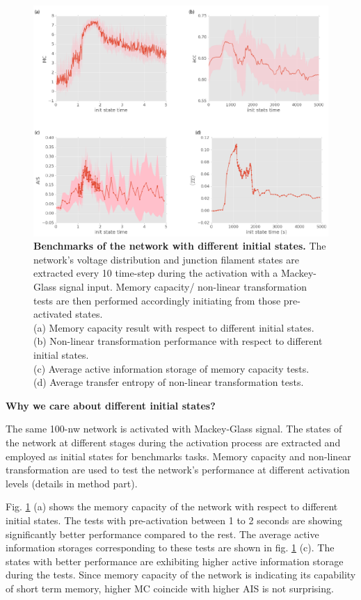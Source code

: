 \documentclass[%
 reprint,
 amsmath,amssymb,
 aps,
floatfix,
]{revtex4-2}
\begin{document}
\begin{figure}[]
	\centering
	\includegraphics[width=1\linewidth]{figure/benchmark.png}
	\caption{\textbf{Benchmarks of the network with different initial states.} The network's voltage distribution and junction filament states are extracted every 10 time-step during the activation with a Mackey-Glass signal input. Memory capacity/ non-linear transformation tests are then performed accordingly initiating from those pre-activated states. \\
	(a) Memory capacity result with respect to different initial states.\\
	(b) Non-linear transformation performance with respect to different initial states.\\
	(c) Average active information storage of memory capacity tests.\\
	(d) Average transfer entropy of non-linear transformation tests.} 
	\label{fig:benchmark}
\end{figure}


\textbf{Why we care about different initial states?} 

The same 100-nw network is activated with Mackey-Glass signal. The states of the network at different stages during the activation process are extracted and employed as initial states for benchmarks tasks. Memory capacity and non-linear transformation are used to test the network's performance at different activation levels (details in method part). 

Fig. \ref{fig:benchmark} (a) shows the memory capacity of the network with respect to different initial states. The tests with pre-activation between 1 to 2 seconds are showing significantly better performance compared to the rest. The average active information storages corresponding to these tests are shown in fig. \ref{fig:benchmark} (c). The states with better performance are exhibiting higher active information storage during the tests. Since memory capacity of the network is indicating its capability of short term memory, higher MC coincide with higher AIS is not surprising.
\end{document}
